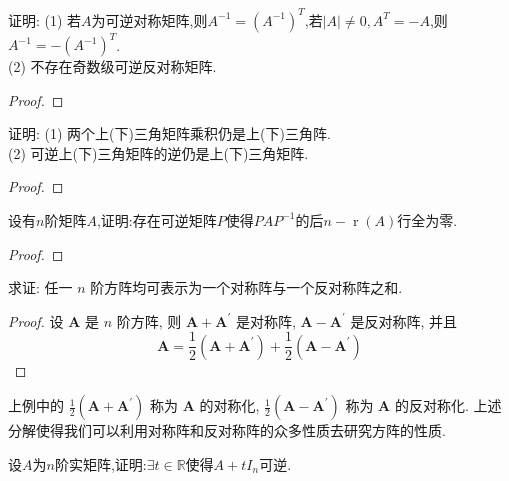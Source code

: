 \begin{problem}
    证明: (1) 若$A$为可逆对称矩阵,则$A^{-1}=(A^{-1})^{T}$,若$|A|\neq0,A^{T}=-A$,则$A^{-1}=-(A^{-1})^{T}$.\\
    (2) 不存在奇数级可逆反对称矩阵.
\end{problem}

\begin{proof}
    
\end{proof}

\begin{problem}
    证明: (1) 两个上(下)三角矩阵乘积仍是上(下)三角阵.\\
    (2) 可逆上(下)三角矩阵的逆仍是上(下)三角矩阵.
\end{problem}

\begin{proof}
    
\end{proof}

\begin{problem}
    设有$n$阶矩阵$A$,证明:存在可逆矩阵$P$使得$PAP^{-1}$的后$n-\operatorname{r}(A)$行全为零.
\end{problem}

\begin{proof}
    
\end{proof}

\begin{problem}
    求证: 任一 $n$ 阶方阵均可表示为一个对称阵与一个反对称阵之和.
\end{problem}

\begin{proof}
设 $\boldsymbol{A}$ 是 $n$ 阶方阵, 则 $\boldsymbol{A}+\boldsymbol{A}^{\prime}$ 是对称阵, $\boldsymbol{A}-\boldsymbol{A}^{\prime}$ 是反对称阵, 并且
$$
\boldsymbol{A}=\frac{1}{2}\left(\boldsymbol{A}+\boldsymbol{A}^{\prime}\right)+\frac{1}{2}\left(\boldsymbol{A}-\boldsymbol{A}^{\prime}\right)
$$
\end{proof}

\begin{remark}
    上例中的 $\frac{1}{2}\left(\boldsymbol{A}+\boldsymbol{A}^{\prime}\right)$ 称为 $\boldsymbol{A}$ 的对称化, $\frac{1}{2}\left(\boldsymbol{A}-\boldsymbol{A}^{\prime}\right)$ 称为 $\boldsymbol{A}$ 的反对称化. 上述分解使得我们可以利用对称阵和反对称阵的众多性质去研究方阵的性质.
\end{remark}

\begin{problem}
    设$A$为$n$阶实矩阵,证明:$\exists t \in \mathbb{R}$使得$A+tI_n$可逆.
\end{problem}

